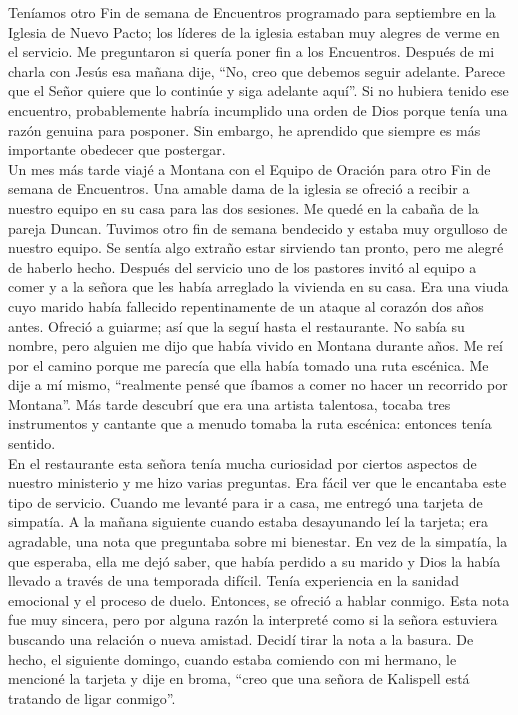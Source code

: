 \documentclass[twoside, 12pt]{book}
\begin{document}
Teníamos otro Fin de semana de Encuentros programado para septiembre en la Iglesia de Nuevo Pacto; los líderes de la iglesia estaban muy alegres de verme en el servicio. Me preguntaron si quería poner fin a los Encuentros. Después de mi charla con Jesús esa mañana dije, “No, creo que debemos seguir adelante. Parece que el Señor quiere que lo continúe y siga adelante aquí”. Si no hubiera tenido ese encuentro, probablemente habría incumplido una orden de Dios porque tenía una razón genuina para posponer.  Sin embargo, he aprendido que siempre es más importante obedecer que postergar.\\

Un mes más tarde viajé a Montana con el Equipo de Oración para otro Fin de semana de Encuentros. Una amable dama de la iglesia se ofreció a recibir a nuestro equipo en su casa para las dos sesiones. Me quedé en la cabaña de la pareja Duncan. Tuvimos otro fin de semana bendecido y estaba muy orgulloso de nuestro equipo. Se sentía algo extraño estar sirviendo tan pronto, pero me alegré de haberlo hecho. Después del servicio uno de los pastores invitó al equipo a comer y a la señora que les había arreglado la vivienda en su casa. Era una viuda cuyo marido había fallecido repentinamente de un ataque al corazón dos años antes. Ofreció a guiarme; así que la seguí hasta el restaurante. No sabía su nombre, pero alguien me dijo que había vivido en Montana durante años.  Me reí por el camino porque me parecía que ella había tomado una ruta escénica. Me dije a mí mismo, “realmente pensé que íbamos a comer no hacer un recorrido por Montana”.  Más tarde descubrí que era una artista talentosa, tocaba tres instrumentos y cantante que a menudo tomaba la ruta escénica: entonces tenía sentido.\\

En el restaurante esta señora tenía mucha curiosidad por ciertos aspectos de nuestro ministerio y me hizo varias preguntas. Era fácil ver que le encantaba este tipo de servicio. Cuando me levanté para ir a casa, me entregó una tarjeta de simpatía. A la mañana siguiente cuando estaba desayunando leí la tarjeta; era agradable, una nota que preguntaba sobre mi bienestar. En vez de la simpatía, la que esperaba, ella me dejó saber, que había perdido a su marido y Dios la había llevado a través de una temporada difícil. Tenía experiencia en la sanidad emocional y el proceso de duelo. Entonces, se ofreció a hablar conmigo. Esta nota fue muy sincera, pero por alguna razón la interpreté como si la señora estuviera buscando una relación o nueva amistad.  Decidí tirar la nota a la basura.  De hecho, el siguiente domingo, cuando estaba comiendo con mi hermano, le mencioné la tarjeta y dije en broma, “creo que una señora de Kalispell está tratando de ligar conmigo”.\\
\end{document}
